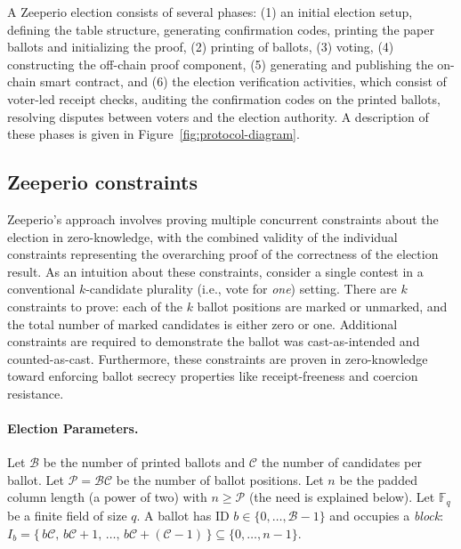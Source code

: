 A Zeeperio election consists of several phases: (1) an initial election setup, defining the table structure, generating confirmation codes, printing the paper ballots and initializing the proof, (2) printing of ballots, (3) voting, (4) constructing the off-chain proof component, (5) generating and publishing the on-chain smart contract, and (6) the election verification activities, which consist of voter-led receipt checks, auditing the confirmation codes on the printed ballots, resolving disputes between voters and the election authority. A description of these phases is given in Figure~\ref{fig:protocol-diagram}.



\subsection{Zeeperio constraints} 

Zeeperio's approach involves proving multiple concurrent constraints about the election in zero-knowledge, with the combined validity of the individual constraints representing the overarching proof of the correctness of the election result. As an intuition about these constraints, consider a single contest in a conventional $k$-candidate plurality (i.e., vote for {\em one}) setting. There are $k$ constraints to prove: each of the $k$ ballot positions are marked or unmarked, and the total number of marked candidates is either zero or one. Additional constraints are required to demonstrate the ballot was cast-as-intended and counted-as-cast. Furthermore, these constraints are proven in zero-knowledge toward enforcing ballot secrecy properties like receipt-freeness and coercion resistance. %


\paragraph{Election Parameters.}
Let $\mathcal{B}$ be the number of printed ballots and $\mathcal{C}$ the number of candidates per ballot. 
Let $\mathcal{P}=\mathcal{B}\mathcal{C}$ be the number of ballot positions. 
Let $n$ be the padded column length (a power of two) with $n\ge \mathcal{P}$ (the need is explained below). 
Let $\mathbb{F}_q$ be a finite field of size $q$. 
A ballot has ID $b\in\{0,\dots,\mathcal{B}-1\}$ and occupies a \emph{block}: $I_b=\{\,b\mathcal{C},\,b\mathcal{C}+1,\,\dots,\,b\mathcal{C}+(\mathcal{C}-1)\,\}\subseteq\{0,\dots,n-1\}.$

